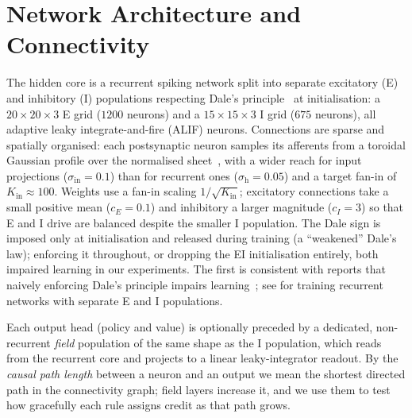 \documentclass[10pt,twocolumn]{article}
\begin{document}
\section{Network Architecture and Connectivity}
\label{app:arch}
The hidden core is a recurrent spiking network split into separate excitatory
(E) and inhibitory (I) populations respecting Dale's
principle~\citep{dale1935pharmacology,vanVreeswijk1996Chaos} at initialisation:
a $20\times20\times3$ E grid ($1200$ neurons) and a $15\times15\times3$ I grid
($675$ neurons), all adaptive leaky integrate-and-fire (ALIF) neurons.
Connections are sparse and spatially organised: each postsynaptic neuron samples
its afferents from a toroidal Gaussian profile over the normalised
sheet~\citep{Spreizer2019Toroidal}, with a wider reach for input projections
($\sigma_{\mathrm{in}}=0.1$) than for recurrent ones ($\sigma_{\mathrm{h}}=0.05$)
and a target fan-in of $K_{\mathrm{in}}\approx100$. Weights use a fan-in scaling
$1/\sqrt{K_{\mathrm{in}}}$;
excitatory connections take a small positive mean ($c_E=0.1$) and inhibitory a
larger magnitude ($c_I=3$) so that E and I drive are balanced despite the
smaller I population. The Dale sign is imposed only at initialisation and
released during training (a ``weakened'' Dale's law); enforcing it throughout,
or dropping the EI initialisation entirely, both impaired learning in our
experiments. The first is consistent with reports that naively enforcing
Dale's principle impairs learning~\citep{Cornford2021DaleANN}; see
\citet{Song2016DaleEI} for training recurrent networks with separate E and I
populations.

Each output head (policy and value) is optionally preceded by a dedicated,
non-recurrent \emph{field} population of the same shape as the I population,
which reads from the recurrent core and projects to a linear leaky-integrator
readout. By the \emph{causal path length} between a neuron and an output we mean
the shortest directed path in the connectivity graph; field layers increase it,
and we use them to test how gracefully each rule assigns credit as that path
grows.
\end{document}
